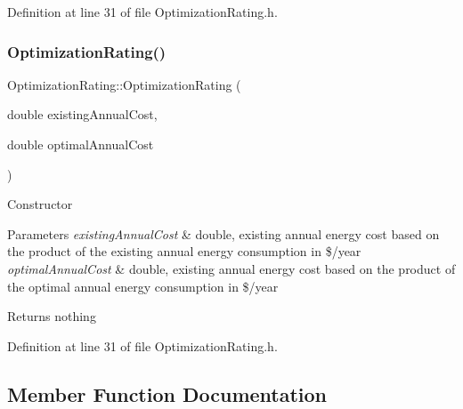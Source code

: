 Definition at line 31 of file Optimization\+Rating.\+h.

\mbox{\label{class_optimization_rating_a775f099775418ff79ae82091f7867c5c}} 
\subsubsection{\texorpdfstring{Optimization\+Rating()}{OptimizationRating()}\hspace{0.1cm}{\footnotesize\ttfamily [3/3]}}
{\footnotesize\ttfamily Optimization\+Rating\+::\+Optimization\+Rating (\begin{DoxyParamCaption}\item[{double}]{existing\+Annual\+Cost,  }\item[{double}]{optimal\+Annual\+Cost }\end{DoxyParamCaption})\hspace{0.3cm}{\ttfamily [inline]}}

Constructor 
\begin{DoxyParams}{Parameters}
{\em existing\+Annual\+Cost} & double, existing annual energy cost based on the product of the existing annual energy consumption in \$/year \\
\hline
{\em optimal\+Annual\+Cost} & double, existing annual energy cost based on the product of the optimal annual energy consumption in \$/year \\
\hline
\end{DoxyParams}
\begin{DoxyReturn}{Returns}
nothing 
\end{DoxyReturn}


Definition at line 31 of file Optimization\+Rating.\+h.



\subsection{Member Function Documentation}
\mbox{\label{class_optimization_rating_ac6e84aa94642911d089e464aae749ffe}} 
